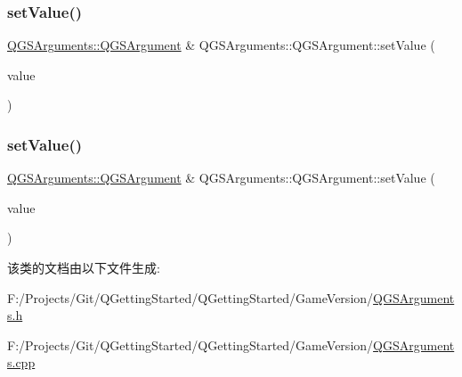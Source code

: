 \subsubsection{\texorpdfstring{set\+Value()}{setValue()}\hspace{0.1cm}{\footnotesize\ttfamily [1/2]}}
{\footnotesize\ttfamily \mbox{\hyperlink{class_q_g_s_arguments_1_1_q_g_s_argument}{Q\+G\+S\+Arguments\+::\+Q\+G\+S\+Argument}} \& Q\+G\+S\+Arguments\+::\+Q\+G\+S\+Argument\+::set\+Value (\begin{DoxyParamCaption}\item[{const Q\+String \&}]{value }\end{DoxyParamCaption})}

\mbox{\label{class_q_g_s_arguments_1_1_q_g_s_argument_a66a89454e76c3a32a72c10ab5198bad6}} 
\subsubsection{\texorpdfstring{set\+Value()}{setValue()}\hspace{0.1cm}{\footnotesize\ttfamily [2/2]}}
{\footnotesize\ttfamily \mbox{\hyperlink{class_q_g_s_arguments_1_1_q_g_s_argument}{Q\+G\+S\+Arguments\+::\+Q\+G\+S\+Argument}} \& Q\+G\+S\+Arguments\+::\+Q\+G\+S\+Argument\+::set\+Value (\begin{DoxyParamCaption}\item[{const Q\+String\+List \&}]{value }\end{DoxyParamCaption})}



该类的文档由以下文件生成\+:\begin{DoxyCompactItemize}
\item 
F\+:/\+Projects/\+Git/\+Q\+Getting\+Started/\+Q\+Getting\+Started/\+Game\+Version/\mbox{\hyperlink{_q_g_s_arguments_8h}{Q\+G\+S\+Arguments.\+h}}\item 
F\+:/\+Projects/\+Git/\+Q\+Getting\+Started/\+Q\+Getting\+Started/\+Game\+Version/\mbox{\hyperlink{_q_g_s_arguments_8cpp}{Q\+G\+S\+Arguments.\+cpp}}\end{DoxyCompactItemize}
